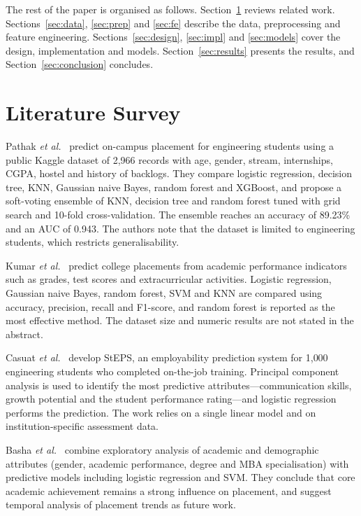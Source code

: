 \documentclass[conference]{IEEEtran}
\begin{document}
The rest of the paper is organised as follows. Section~\ref{sec:lit} reviews related work.
Sections~\ref{sec:data}, \ref{sec:prep} and \ref{sec:fe} describe the data, preprocessing and feature
engineering. Sections~\ref{sec:design}, \ref{sec:impl} and \ref{sec:models} cover the design, implementation and
models. Section~\ref{sec:results} presents the results, and Section~\ref{sec:conclusion} concludes.

\section{Literature Survey}\label{sec:lit}
Pathak \emph{et al.}~\cite{pathak2025framework} predict on-campus placement for engineering students using a
public Kaggle dataset of 2{,}966 records with age, gender, stream, internships, CGPA, hostel and history of
backlogs. They compare logistic regression, decision tree, KNN, Gaussian naive Bayes, random forest and
XGBoost, and propose a soft-voting ensemble of KNN, decision tree and random forest tuned with grid search and
10-fold cross-validation. The ensemble reaches an accuracy of 89.23\% and an AUC of 0.943. The authors note that
the dataset is limited to engineering students, which restricts generalisability.

Kumar \emph{et al.}~\cite{kumar2023predicting} predict college placements from academic performance indicators
such as grades, test scores and extracurricular activities. Logistic regression, Gaussian naive Bayes, random
forest, SVM and KNN are compared using accuracy, precision, recall and F1-score, and random forest is reported
as the most effective method. The dataset size and numeric results are not stated in the abstract.

Casuat \emph{et al.}~\cite{casuat2020steps} develop StEPS, an employability prediction system for 1{,}000
engineering students who completed on-the-job training. Principal component analysis is used to identify the
most predictive attributes---communication skills, growth potential and the student performance rating---and
logistic regression performs the prediction. The work relies on a single linear model and on
institution-specific assessment data.

Basha \emph{et al.}~\cite{basha2023unraveling} combine exploratory analysis of academic and demographic
attributes (gender, academic performance, degree and MBA specialisation) with predictive models including
logistic regression and SVM. They conclude that core academic achievement remains a strong influence on
placement, and suggest temporal analysis of placement trends as future work.
\end{document}
